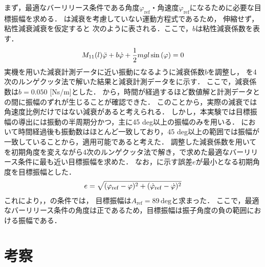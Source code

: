         まず，最適なバーリリース条件である角度$\varphi_{\mathrm{ref}}$・角速度$\dot{\varphi}_{\mathrm{ref}}$になるために必要な目標振幅を求める．
        は減衰を考慮していない運動方程式であるため，
        伸縮せず，粘性減衰減衰を仮定すると
        次のように表される．ここで，$b$は粘性減衰係数を表す．
        \begin{eqnarray}
          \equlabel{dampingEquation}
          M_{11}(l)\ddot{\varphi}+b\dot{\varphi}+\frac{1}{2}mgl\sin{(\varphi)}=0          
          \end{eqnarray}
        実機を用いた減衰計測データに近い振動になるように減衰係数$b$を調整し，
        を4次のルンゲクッタ法で解いた結果と減衰計測データをに示す．
        ここで，減衰係数は$b=0.050$ [Ns/m]とした．
        から，時間が経過するほど数値解と計測データとの間に振幅のずれが生じることが確認できた．
        このことから，実際の減衰では角速度比例だけではない減衰があると考えられる．
        しかし，本実験では目標振幅の導出には振動の半周期分かつ，主に45 deg以上の振幅のみを用いる．
        において時間経過後も振動数はほとんど一致しており，45 deg以上の範囲では振幅が一致していることから，適用可能であると考えた．
        調整した減衰係数を用いてを初期角度を変えながら4次のルンゲクッタ法で解き，で求めた最適なバーリリース条件に最も近い目標振幅を求めた．
        なお，に示す誤差$e$が最小となる初期角度を目標振幅とした．
        \begin{eqnarray}
          \equlabel{error}
          e=\sqrt{(\varphi_{\mathrm{ref}}-\varphi)^2+(\dot{\varphi}_{\mathrm{ref}}-\dot{\varphi})^2}
          \end{eqnarray}
        これにより，，の条件では，
        目標振幅は$A_{\mathrm{ref}}=89\,\mathrm{deg}$と求まった．
        ここで，最適なバーリリース条件の角度は正であるため，目標振幅は振子角度の負の範囲における振幅である．

      

        \section{考察}
